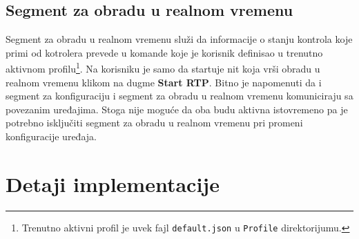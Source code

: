 \documentclass[12pt,oneside]{memoir}
\begin{document}
	\subsection{Segment za obradu u realnom vremenu}
	Segment za obradu u realnom vremenu služi da informacije o stanju kontrola koje primi od kotrolera prevede u komande koje je korisnik definisao u trenutno aktivnom profilu\footnote{Trenutno aktivni profil je uvek fajl \texttt{default.json} u \texttt{Profile} direktorijumu.}. Na korisniku je samo da startuje nit koja vrši obradu u realnom vremenu klikom na dugme \textbf{Start RTP}. Bitno je napomenuti da i segment za konfiguraciju i segment za obradu u realnom vremenu komuniciraju sa povezanim uređajima. Stoga nije moguće da oba budu aktivna istovremeno pa je potrebno isključiti segment za obradu u realnom vremenu pri promeni konfiguracije uređaja.
	\section{Detaji implementacije}
\end{document}
